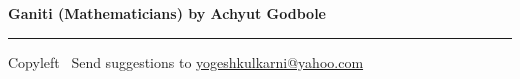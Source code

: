

\usepackage{beamerarticle} %
\usepackage{tikz-qtree}


\raggedright
\footnotesize


\begin{center}
     \Large{\textbf{Ganiti (Mathematicians) by Achyut Godbole}}  %
\end{center}


\begin{multicols}{3}

\end{multicols}

\rule{\linewidth}{0.25pt}
\scriptsize
Copyleft \textcopyleft\  Send suggestions to 
\href{http://www.yogeshkulkarni.com}{yogeshkulkarni@yahoo.com}


